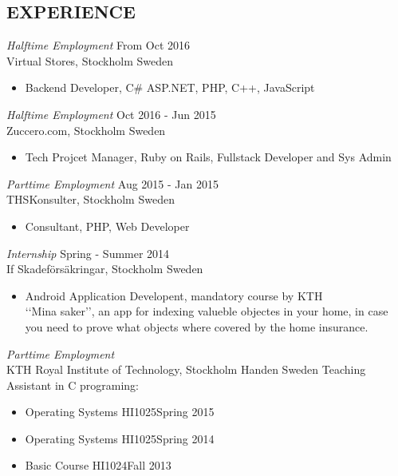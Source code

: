 \documentclass[margin]{res}
\begin{document}
\begin{resume}
\section{EXPERIENCE}
{\sl Halftime Employment } \hfill From Oct 2016 \\
                Virtual Stores, Stockholm Sweden
                \begin{itemize} \itemsep -2pt
                \item Backend Developer, C\# ASP.NET, PHP, C++, JavaScript\hfill 
                \end{itemize}
{\sl Halftime Employment } \hfill  Oct 2016 - Jun 2015 \\
                Zuccero.com, Stockholm Sweden
                 \begin{itemize}  \itemsep -2pt %
                 \item  Tech Projcet Manager, Ruby on Rails, Fullstack Developer and Sys Admin\hfill 
                \end{itemize}
{\sl Parttime Employment } \hfill  Aug 2015 - Jan 2015 \\
                THSKonsulter, Stockholm Sweden
                 \begin{itemize}  \itemsep -2pt %
                 \item  Consultant, PHP, Web Developer\hfill 
                \end{itemize}
    {\sl Internship } \hfill Spring - Summer 2014 \\
                If Skadeförsäkringar, Stockholm Sweden
                 \begin{itemize}  \itemsep -2pt %
                 \item Android Application Developent, mandatory course by KTH \\ ‘‘Mina saker’’, an app for indexing valueble objectes in your home, in case you need to prove what objects where covered by the home insurance.
                \end{itemize}

   {\sl Parttime Employment }  \\
               KTH Royal Institute of Technology, Stockholm Handen Sweden
               Teaching Assistant in C programing:
                 \begin{itemize}  \itemsep -2pt %
                 \item   Operating Systems HI1025\hfill Spring 2015
                 \item  Operating Systems HI1025\hfill Spring 2014
                 \item  Basic Course HI1024\hfill Fall 2013
                \end{itemize}


\end{resume}
\end{document}
